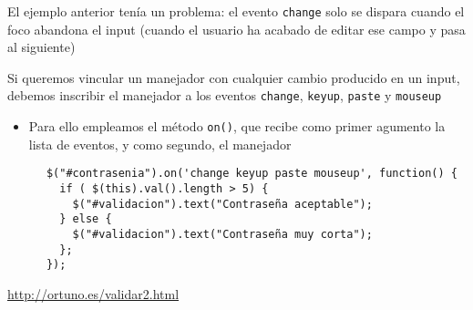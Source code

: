 \documentclass[ucs]{beamer}
\begin{document}
\begin{frame}[fragile]
\frametitle{}
El ejemplo anterior tenía un problema: el evento
\verb|change|
solo se dispara cuando el foco abandona el input
(cuando el usuario ha acabado de editar ese campo y
pasa al siguiente)

Si queremos vincular un manejador con cualquier cambio producido en 
un input, debemos inscribir el manejador a los eventos
\verb|change|,
\verb|keyup|, 
\verb|paste| y 
\verb|mouseup|


    \begin{itemize}
    \item
Para ello empleamos el método \verb|on()|, que recibe como primer agumento
la lista de eventos, y como segundo, el manejador
    \end{itemize}

  \begin{scriptsize}
  \begin{verbatim}
      $("#contrasenia").on('change keyup paste mouseup', function() {
        if ( $(this).val().length > 5) {
          $("#validacion").text("Contraseña aceptable");
        } else {
          $("#validacion").text("Contraseña muy corta");
        };
      });
  \end{verbatim}
  \end{scriptsize}

\begin{tiny}
\begin{flushright}
\url{http://ortuno.es/validar2.html}
\end{flushright}
\end{tiny}

\end{frame}
\end{document}
